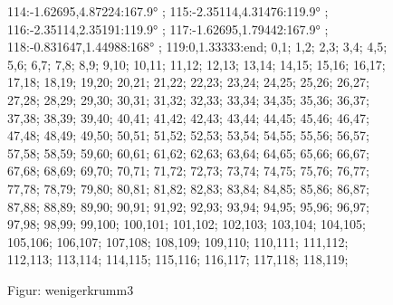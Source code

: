 \documentclass[a4paper,10pt,ngerman]{scrartcl}
\begin{document}
\begin{figure}[!h]
{            114:-1.62695,4.87224:167.9° ;
            115:-2.35114,4.31476:119.9° ;
            116:-2.35114,2.35191:119.9° ;
            117:-1.62695,1.79442:167.9° ;
            118:-0.831647,1.44988:168° ;
            119:0,1.33333:end;
        }{
            0,1;
            1,2;
            2,3;
            3,4;
            4,5;
            5,6;
            6,7;
            7,8;
            8,9;
            9,10;
            10,11;
            11,12;
            12,13;
            13,14;
            14,15;
            15,16;
            16,17;
            17,18;
            18,19;
            19,20;
            20,21;
            21,22;
            22,23;
            23,24;
            24,25;
            25,26;
            26,27;
            27,28;
            28,29;
            29,30;
            30,31;
            31,32;
            32,33;
            33,34;
            34,35;
            35,36;
            36,37;
            37,38;
            38,39;
            39,40;
            40,41;
            41,42;
            42,43;
            43,44;
            44,45;
            45,46;
            46,47;
            47,48;
            48,49;
            49,50;
            50,51;
            51,52;
            52,53;
            53,54;
            54,55;
            55,56;
            56,57;
            57,58;
            58,59;
            59,60;
            60,61;
            61,62;
            62,63;
            63,64;
            64,65;
            65,66;
            66,67;
            67,68;
            68,69;
            69,70;
            70,71;
            71,72;
            72,73;
            73,74;
            74,75;
            75,76;
            76,77;
            77,78;
            78,79;
            79,80;
            80,81;
            81,82;
            82,83;
            83,84;
            84,85;
            85,86;
            86,87;
            87,88;
            88,89;
            89,90;
            90,91;
            91,92;
            92,93;
            93,94;
            94,95;
            95,96;
            96,97;
            97,98;
            98,99;
            99,100;
            100,101;
            101,102;
            102,103;
            103,104;
            104,105;
            105,106;
            106,107;
            107,108;
            108,109;
            109,110;
            110,111;
            111,112;
            112,113;
            113,114;
            114,115;
            115,116;
            116,117;
            117,118;
            118,119;
        }
        \caption{Figur: wenigerkrumm3}
        \label{fig:wenigerkrumm3}
    \end{figure}
\end{document}
